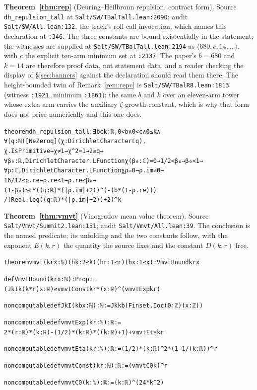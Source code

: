 \documentclass{CUP-JNL-FMP}
\newcommand{\leaninline}[1]{{\small\texttt{#1}}}
\theoremstyle{remark}
\begin{document}
\medskip\noindent\textbf{Theorem~\ref{thm:rep}} (Deuring--Heilbronn repulsion,
contract form). Source \leaninline{dh\_repulsion\_tall} at
\leaninline{Salt/SW/TBalTall.lean:2090}; audit
\leaninline{Salt/SW/All.lean:132}, the track's roll-call invocation, which names
this declaration at \leaninline{:346}. The three constants are bound
existentially in the statement; the witnesses are supplied at
\leaninline{Salt/SW/TBalTall.lean:2194} as $\langle 680, c, 14, \ldots \rangle$,
with $c$ the explicit ten-arm minimum set at \leaninline{:2137}. The paper's
$b = 680$ and $k = 14$ are therefore proof data, not statement data, and a
reader checking the display of \S\ref{sec:banners} against the declaration
should read them there. The height-bounded twin of
Remark~\ref{rem:repc} is \leaninline{Salt/SW/TBalR8.lean:1813} (witness
\leaninline{:1921}, minimum \leaninline{:1861}): the same $b$ and $k$ over an
eleven-arm tower whose extra arm carries the auxiliary $\zeta$-growth constant,
which is why that form does not price numerically and this one does.
{\footnotesize\begin{alltt}
theorem dh_repulsion_tall : ∃ b c k : ℝ, 0 < b ∧ 0 < c ∧ 0 ≤ k ∧
    ∀ (q : ℕ) [NeZero q] (χ : DirichletCharacter ℂ q),
      χ.IsPrimitive → χ ≠ 1 → χ ^ 2 = 1 → 2 ≤ q →
      ∀ β₀ : ℝ, DirichletCharacter.LFunction χ (β₀ : ℂ) = 0 → 1 / 2 < β₀ → β₀ < 1 →
      ∀ ρ : ℂ, DirichletCharacter.LFunction χ ρ = 0 → ρ.im ≠ 0 →
        16 / 17 ≤ ρ.re → ρ.re < 1 → ρ.re ≤ β₀ →
        (1 - β₀) ≥ c * ((q : ℝ) * (|ρ.im| + 2)) ^ (-(b * (1 - ρ.re)))
          / (Real.log ((q : ℝ) * (|ρ.im| + 2)) + 2) ^ k
\end{alltt}}

\medskip\noindent\textbf{Theorem~\ref{thm:vmvt}} (Vinogradov mean value theorem).
Source \leaninline{Salt/Vmvt/Summit2.lean:151}; audit
\leaninline{Salt/Vmvt/All.lean:39}. The conclusion is the named predicate; its
unfolding and the two constants follow, with the exponent $E(k,r)$ the quantity
the source fixes and the constant $D(k,r)$ free.
{\footnotesize\begin{alltt}
theorem vmvt (k r x : ℕ) (hk : 2 ≤ k) (hr : 1 ≤ r) (hx : 1 ≤ x) : VmvtBound k r x

def VmvtBound (k r x : ℕ) : Prop :=
  (JkI k (k * r) x : ℝ) ≤ vmvtConst k r * (x : ℝ) ^ (vmvtExp k r)

noncomputable def JkI (k b x : ℕ) : ℕ := Jk k b (Finset.Ioc (0 : ℤ) (x : ℤ))

noncomputable def vmvtExp (k r : ℕ) : ℝ :=
  2 * (r : ℝ) * (k : ℝ) - (1 / 2) * (k : ℝ) * ((k : ℝ) + 1) + vmvtEta k r

noncomputable def vmvtEta (k r : ℕ) : ℝ := (1 / 2) * (k : ℝ) ^ 2 * (1 - 1 / (k : ℝ)) ^ r

noncomputable def vmvtConst (k r : ℕ) : ℝ := (vmvtC0 k) ^ r

noncomputable def vmvtC0 (k : ℕ) : ℝ := (k : ℝ) ^ (24 * k ^ 2)
\end{alltt}}
\end{document}
